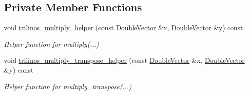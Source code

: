 \subsection*{Private Member Functions}
\begin{DoxyCompactItemize}
\item 
void \hyperlink{classoomph_1_1MatrixVectorProduct_a431b4a1aec80593b729aef89d26dd408}{trilinos\+\_\+multiply\+\_\+helper} (const \hyperlink{classoomph_1_1DoubleVector}{Double\+Vector} \&x, \hyperlink{classoomph_1_1DoubleVector}{Double\+Vector} \&y) const
\begin{DoxyCompactList}\small\item\em Helper function for multiply(...) \end{DoxyCompactList}\item 
void \hyperlink{classoomph_1_1MatrixVectorProduct_a192d6aba55af4354c22bc44ab9c9b064}{trilinos\+\_\+multiply\+\_\+transpose\+\_\+helper} (const \hyperlink{classoomph_1_1DoubleVector}{Double\+Vector} \&x, \hyperlink{classoomph_1_1DoubleVector}{Double\+Vector} \&y) const
\begin{DoxyCompactList}\small\item\em Helper function for multiply\+\_\+transpose(...) \end{DoxyCompactList}\end{DoxyCompactItemize}
